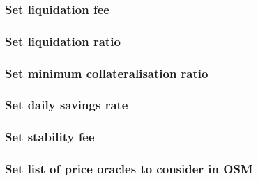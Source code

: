 \documentclass{article} %
\begin{document}
\subsubsection{Set liquidation fee}

\subsubsection{Set liquidation ratio}

\subsubsection{Set minimum collateralisation ratio}

\subsubsection{Set daily savings rate}

\subsubsection{Set stability fee}

\subsubsection{Set list of price oracles to consider in OSM}
\end{document}

